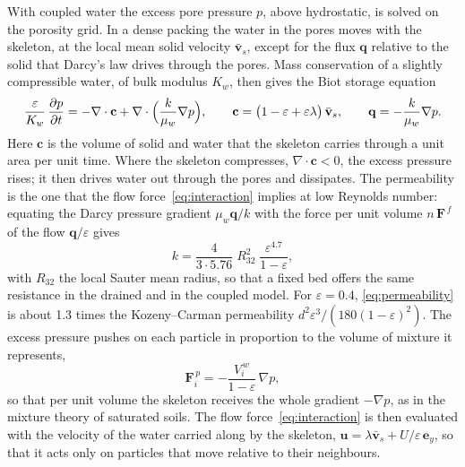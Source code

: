 With coupled water the excess pore pressure $p$, above hydrostatic, is solved on
the porosity grid.  In a dense packing the water in the pores moves with the
skeleton, at the local mean solid velocity $\bar{\mathbf{v}}_{s}$, except for the
flux $\mathbf{q}$ relative to the solid that Darcy's law drives through the
pores.  Mass conservation of a slightly compressible water, of bulk modulus
$K_{w}$, then gives the Biot storage equation
\begin{equation}
  \frac{\varepsilon}{K_{w}}\,\frac{\partial p}{\partial t}
  = -\nabla\cdot\mathbf{c} + \nabla\cdot\Bigl(\frac{k}{\mu_{w}}\nabla p\Bigr),
  \qquad
  \mathbf{c} = \bigl(1-\varepsilon+\varepsilon\lambda\bigr)\,\bar{\mathbf{v}}_{s},
  \qquad
  \mathbf{q} = -\frac{k}{\mu_{w}}\nabla p .
  \label{eq:biot}
\end{equation}
Here $\mathbf{c}$ is the volume of solid and water that the skeleton carries
through a unit area per unit time.  Where the skeleton compresses,
$\nabla\cdot\mathbf{c}<0$, the excess pressure rises; it then drives water out
through the pores and dissipates.  The permeability is the one that the flow
force~\eqref{eq:interaction} implies at low Reynolds number: equating the
Darcy pressure gradient $\mu_{w}\mathbf{q}/k$ with the force per unit volume
$n\,\mathbf{F}^{\,f}$ of the flow $\mathbf{q}/\varepsilon$ gives
\begin{equation}
  k = \frac{4}{3\cdot5.76}\;R_{32}^{2}\;\frac{\varepsilon^{4.7}}{1-\varepsilon},
  \label{eq:permeability}
\end{equation}
with $R_{32}$ the local Sauter mean radius, so that a fixed bed offers the same
resistance in the drained and in the coupled model.  For $\varepsilon=0.4$,
\eqref{eq:permeability} is about \num{1.3} times the Kozeny--Carman
permeability $d^{2}\varepsilon^{3}/(180(1-\varepsilon)^{2})$.  The excess pressure pushes on each particle in
proportion to the volume of mixture it represents,
\begin{equation}
  \mathbf{F}_{i}^{\,p} = -\frac{V_{i}^{\,w}}{1-\varepsilon}\,\nabla p ,
  \label{eq:pressure-force}
\end{equation}
so that per unit volume the skeleton receives the whole gradient $-\nabla p$, as
in the mixture theory of saturated soils.  The flow force~\eqref{eq:interaction}
is then evaluated with the velocity of the water carried along by the skeleton,
$\mathbf{u}=\lambda\bar{\mathbf{v}}_{s}+U/\varepsilon\,\mathbf{e}_{y}$, so that it
acts only on particles that move relative to their neighbours.

